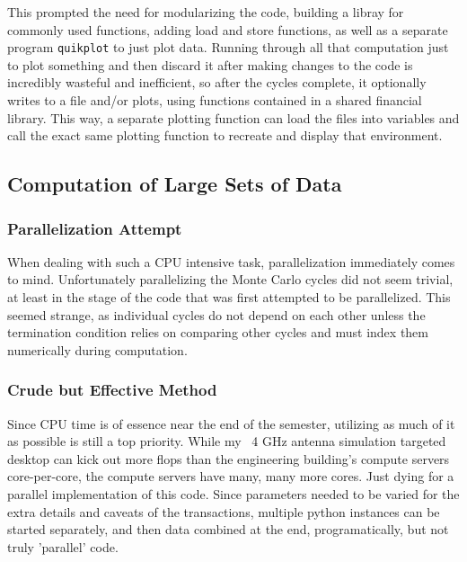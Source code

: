 \documentclass[12pt]{article} %
\begin{document}
This prompted the need for modularizing the code, building a libray for
commonly used functions, adding load and store functions, as well as a
separate program \texttt{quikplot} to just plot data. Running through all that computation just
to plot something and then discard it after making changes to the code is
incredibly wasteful and inefficient, so after the cycles complete, it
optionally writes to a file and/or plots, using functions contained in a shared
financial library. This way, a separate plotting function can load the files
into variables and call the exact same plotting function to recreate and
display that environment.

\subsection{Computation of Large Sets of Data}
\subsubsection{Parallelization Attempt}
When dealing with such a CPU intensive task, parallelization immediately comes
to mind. Unfortunately parallelizing the Monte Carlo cycles did not seem
trivial, at least in the stage of the code that was first attempted to be
parallelized. This seemed strange, as individual cycles do not depend on each
other unless the termination condition relies on comparing other cycles and
must index them numerically during computation.

\subsubsection{Crude but Effective Method}
Since CPU time is of essence near the end of the semester, utilizing as much of
it as possible is still a top priority. While my ~4 GHz antenna simulation
targeted desktop can kick out more flops than the engineering building's
compute servers core-per-core, the compute servers have many, many more cores.
Just dying for a parallel implementation of this code. Since parameters needed
to be varied for the extra details and caveats of the transactions, multiple
python instances can be started separately, and then data combined at the end,
programatically, but not truly 'parallel' code.
\end{document}
